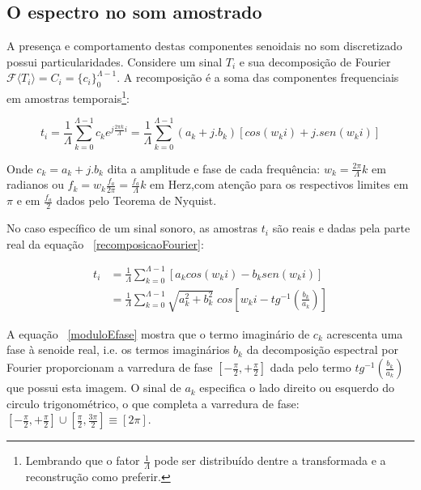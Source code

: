 \subsection{O espectro no som amostrado}
A presença e comportamento destas componentes senoidais 
no som discretizado possui particularidades. Considere um sinal $T_i$ e sua decomposição de Fourier $\mathcal{F}\langle T_i\rangle=C_i=\{c_i\}_0^{\Lambda-1}$. A recomposição é a soma das componentes frequenciais em amostras temporais\footnote{Lembrando que o fator $\frac{1}{\Lambda}$ pode ser distribuído dentre a transformada e a reconstrução como preferir.}:

 
\begin{equation}\label{recomposicaoFourier}
t_i = \frac{1}{\Lambda}\sum_{k=0}^{\Lambda-1}c_ke^{j \frac{2\pi k}{\Lambda} i } = \frac{1}{\Lambda}\sum_{k=0}^{\Lambda-1}(a_k+ j . b_k)\left[cos(w_k i) +j . sen(w_k i)\right]
\end{equation}

Onde $c_k = a_k + j . b_k$ dita a amplitude e fase de cada frequência: $w_k=\frac{2\pi}{\Lambda}k$ em radianos ou $f_k=w_k\frac{f_a}{2\pi}=\frac{f_a}{\Lambda}k$ em Herz,com atenção para os respectivos limites em $\pi$ e em $\frac{f_a}{2}$ dados pelo Teorema de Nyquist. 

No caso específico de um sinal sonoro, as amostras $t_i$ são reais e dadas pela parte real da equação ~\ref{recomposicaoFourier}:

\begin{equation}\label{moduloEfase}
\begin{split}
t_i& = \frac{1}{\Lambda}\sum_{k=0}^{\Lambda-1}\left[a_k cos(w_k i) -b_k sen(w_k i)\right] \\
   & = \frac{1}{\Lambda}\sum_{k=0}^{\Lambda-1}\sqrt{a_k^2 + b_k^2} \; cos\left[w_k i - tg^{-1}\left(\frac{b_k}{a_k}\right)\right]
\end{split}
\end{equation}

A equação ~\ref{moduloEfase} mostra que o termo imaginário de $c_k$ acrescenta uma fase à senoide real, i.e. os termos imaginários $b_k$ da decomposição espectral por Fourier proporcionam a varredura de fase
 $\left[-\frac{\pi}{2},+\frac{\pi}{2}\right]$ dada pelo termo $tg^{-1}\left(\frac{b_k}{a_k}\right)$ que possui esta imagem. O sinal de $a_k$ especifica o lado direito ou esquerdo do circulo trigonométrico,  o que completa a varredura de fase: $\left[-\frac{\pi}{2},+\frac{\pi}{2}\right] \cup \left[\frac{\pi}{2},\frac{3\pi}{2}\right]\equiv [2\pi]$.


